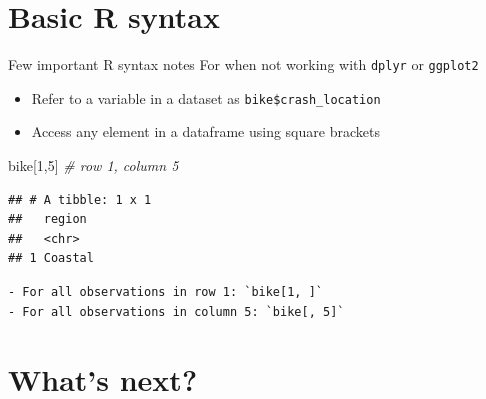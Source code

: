 \documentclass[
  ignorenonframetext,
]{beamer}
\newenvironment{Shaded}{\begin{snugshade}}{\end{snugshade}}
\newcommand{\CommentTok}[1]{\textcolor[rgb]{0.56,0.35,0.01}{\textit{#1}}}
\newcommand{\DecValTok}[1]{\textcolor[rgb]{0.00,0.00,0.81}{#1}}
\newcommand{\NormalTok}[1]{#1}
\begin{document}
\hypertarget{basic-r-syntax}{%
\section{Basic R syntax}\label{basic-r-syntax}}

\begin{frame}[fragile]{Few important R syntax notes}
\protect\hypertarget{few-important-r-syntax-notes}{}
For when not working with \texttt{dplyr} or \texttt{ggplot2}

\begin{itemize}
\item
  Refer to a variable in a dataset as \texttt{bike\$crash\_location}
\item
  Access any element in a dataframe using square brackets
\end{itemize}

\begin{Shaded}
\begin{Highlighting}[]
\NormalTok{bike[}\DecValTok{1}\NormalTok{,}\DecValTok{5}\NormalTok{] }\CommentTok{\# row 1, column 5}
\end{Highlighting}
\end{Shaded}

\begin{verbatim}
## # A tibble: 1 x 1
##   region 
##   <chr>  
## 1 Coastal
\end{verbatim}

\begin{verbatim}
- For all observations in row 1: `bike[1, ]`
- For all observations in column 5: `bike[, 5]`
\end{verbatim}
\end{frame}

\hypertarget{whats-next}{%
\section{What's next?}\label{whats-next}}
\end{document}
